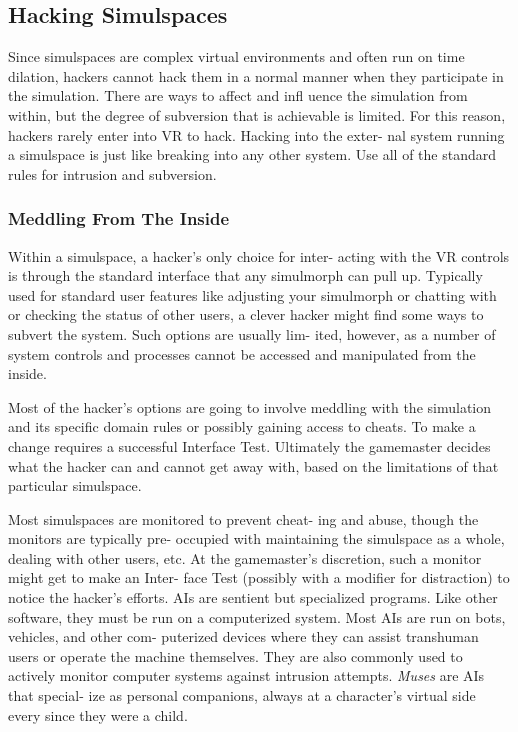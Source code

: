 \subsection{Hacking Simulspaces}

Since simulspaces are complex virtual environments 
and often run on time dilation, hackers cannot hack 
them in a normal manner when they participate in the 
simulation. There are ways to affect and infl uence the 
simulation from within, but the degree of subversion 
that is achievable is limited. For this reason, hackers 
rarely enter into VR to hack. Hacking into the exter-
nal system running a simulspace is just like breaking 
into any other system. Use all of the standard rules for 
intrusion and subversion.

\subsubsection{Meddling From The Inside}

Within a simulspace, a hacker's only choice for inter-
acting with the VR controls is through the standard 
interface that any simulmorph can pull up. Typically 
used for standard user features like adjusting your 
simulmorph or chatting with or checking the status 
of other users, a clever hacker might find some ways 
to subvert the system. Such options are usually lim-
ited, however, as a number of system controls and 
processes cannot be accessed and manipulated from 
the inside.

Most of the hacker's options are going to involve 
meddling with the simulation and its specific domain 
rules or possibly gaining access to cheats. To make a 
change requires a successful Interface Test. Ultimately 
the gamemaster decides what the hacker can and 
cannot get away with, based on the limitations of that 
particular simulspace.

Most simulspaces are monitored to prevent cheat-
ing and abuse, though the monitors are typically pre-
occupied with maintaining the simulspace as a whole, 
dealing with other users, etc. At the gamemaster's 
discretion, such a monitor might get to make an Inter-
face Test (possibly with a modifier for distraction) to 
notice the hacker's efforts.
AIs are sentient but specialized programs. Like other 
software, they must be run on a computerized system. 
Most AIs are run on bots, vehicles, and other com-
puterized devices where they can assist transhuman 
users or operate the machine themselves. They are also 
commonly used to actively monitor computer systems 
against intrusion attempts. \textit{Muses} are AIs that special-
ize as personal companions, always at a character's 
virtual side every since they were a child.

